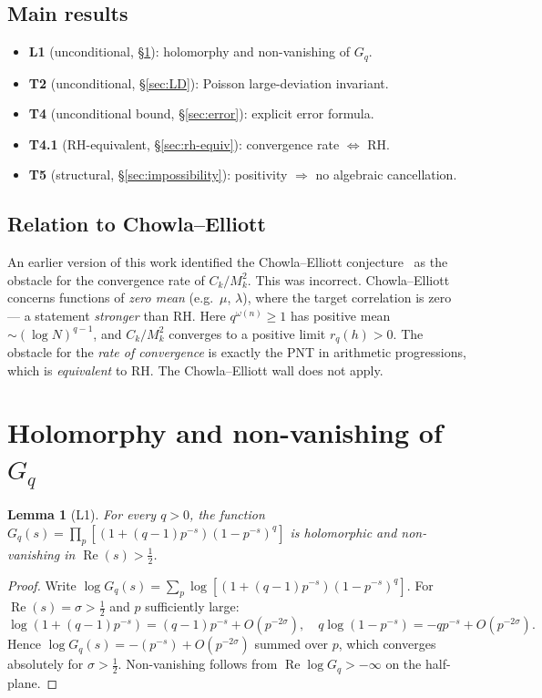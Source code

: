 \documentclass[11pt]{amsart}
\newtheorem{lemma}[theorem]{Lemma}
\theoremstyle{definition}
\theoremstyle{remark}
\renewcommand{\Re}{\operatorname{Re}}
\newcommand{\half}{\tfrac12}
\newcommand{\om}{\omega}
\begin{document}
\subsection*{Main results}

\begin{itemize}
\item \textbf{L1} (unconditional, \S\ref{sec:Gq}): holomorphy and non-vanishing of $G_q$.
\item \textbf{T2} (unconditional, \S\ref{sec:LD}): Poisson large-deviation invariant.
\item \textbf{T4} (unconditional bound, \S\ref{sec:error}): explicit error formula.
\item \textbf{T4.1} (RH-equivalent, \S\ref{sec:rh-equiv}): convergence rate $\Leftrightarrow$ RH.
\item \textbf{T5} (structural, \S\ref{sec:impossibility}): positivity $\Rightarrow$ no
  algebraic cancellation.
\end{itemize}

\subsection*{Relation to Chowla--Elliott}

An earlier version of this work identified the Chowla--Elliott conjecture~\cite{E74}
as the obstacle for the convergence rate of $C_k/M_k^2$.  This was incorrect.
Chowla--Elliott concerns functions of \emph{zero mean} (e.g.\ $\mu$, $\lambda$), where
the target correlation is zero --- a statement \emph{stronger} than RH.  Here
$q^{\om(n)}\ge 1$ has positive mean $\sim(\log N)^{q-1}$, and $C_k/M_k^2$ converges to
a positive limit $r_q(h)>0$.  The obstacle for the \emph{rate of convergence} is
exactly the PNT in arithmetic progressions, which is \emph{equivalent} to RH.
The Chowla--Elliott wall does not apply.

\section{Holomorphy and non-vanishing of $G_q$}
\label{sec:Gq}

\begin{lemma}[L1]\label{lem:Gq}
  For every $q>0$, the function $G_q(s)=\prod_p[(1+(q-1)p^{-s})(1-p^{-s})^q]$
  is holomorphic and non-vanishing in $\Re(s)>\half$.
\end{lemma}
\begin{proof}
  Write $\log G_q(s) = \sum_p \log[(1+(q-1)p^{-s})(1-p^{-s})^q]$.
  For $\Re(s)=\sigma>\half$ and $p$ sufficiently large:
  \[
    \log(1+(q-1)p^{-s}) = (q-1)p^{-s} + O(p^{-2\sigma}),\quad
    q\log(1-p^{-s}) = -qp^{-s} + O(p^{-2\sigma}).
  \]
  Hence $\log G_q(s) = -(p^{-s}) + O(p^{-2\sigma})$ summed over $p$, which
  converges absolutely for $\sigma>\half$.  Non-vanishing follows from
  $\Re\log G_q>-\infty$ on the half-plane.
\end{proof}
\end{document}
